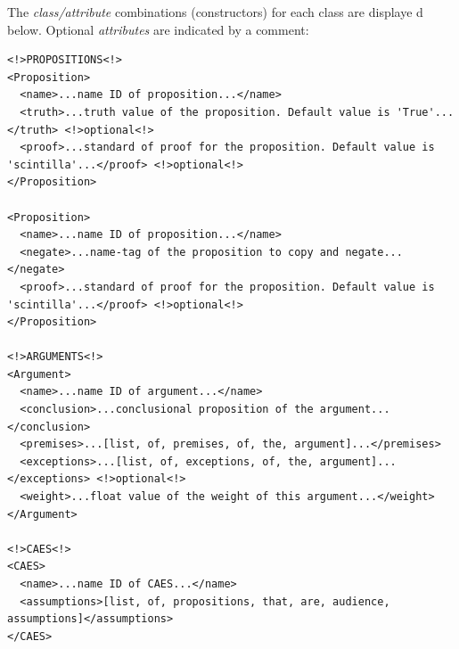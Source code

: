 \documentclass[10pt,a4paper,twocolumn]{article}
\begin{document}
The \textit{class/attribute} combinations (constructors) for each class are displaye
d below. Optional \textit{attributes} are indicated by a comment:

\begin{lstlisting}
<!>PROPOSITIONS<!>
<Proposition>
  <name>...name ID of proposition...</name>
  <truth>...truth value of the proposition. Default value is 'True'...</truth> <!>optional<!>
  <proof>...standard of proof for the proposition. Default value is 'scintilla'...</proof> <!>optional<!>
</Proposition>

<Proposition>
  <name>...name ID of proposition...</name>
  <negate>...name-tag of the proposition to copy and negate...</negate>
  <proof>...standard of proof for the proposition. Default value is 'scintilla'...</proof> <!>optional<!>
</Proposition>

<!>ARGUMENTS<!>
<Argument>
  <name>...name ID of argument...</name>
  <conclusion>...conclusional proposition of the argument...</conclusion>
  <premises>...[list, of, premises, of, the, argument]...</premises>
  <exceptions>...[list, of, exceptions, of, the, argument]...</exceptions> <!>optional<!>
  <weight>...float value of the weight of this argument...</weight>
</Argument>

<!>CAES<!>
<CAES>
  <name>...name ID of CAES...</name>
  <assumptions>[list, of, propositions, that, are, audience, assumptions]</assumptions>
</CAES>
\end{lstlisting}
\end{document}
